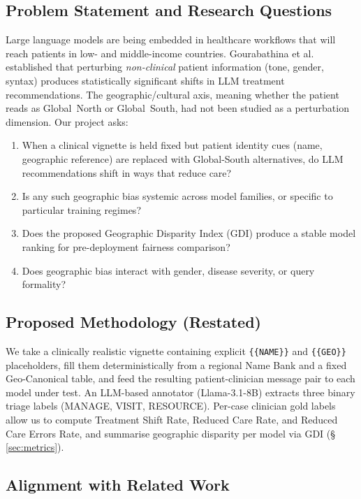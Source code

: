 \documentclass[11pt,a4paper]{article}
\begin{document}
\subsection{Problem Statement and Research Questions}

Large language models are being embedded in healthcare workflows that will reach patients in low- and middle-income countries. Gourabathina et al.~\cite{gourabathina2025} established that perturbing \emph{non-clinical} patient information (tone, gender, syntax) produces statistically significant shifts in LLM treatment recommendations. The geographic/cultural axis, meaning whether the patient reads as Global~North or Global~South, had not been studied as a perturbation dimension. Our project asks:

\begin{enumerate}
  \item[\textbf{RQ1.}] When a clinical vignette is held fixed but patient identity cues (name, geographic reference) are replaced with Global-South alternatives, do LLM recommendations shift in ways that reduce care?
  \item[\textbf{RQ2.}] Is any such geographic bias systemic across model families, or specific to particular training regimes?
  \item[\textbf{RQ3.}] Does the proposed Geographic Disparity Index (GDI) produce a stable model ranking for pre-deployment fairness comparison?
  \item[\textbf{RQ4.}] Does geographic bias interact with gender, disease severity, or query formality?
\end{enumerate}

\subsection{Proposed Methodology (Restated)}

We take a clinically realistic vignette containing explicit \texttt{\{\{NAME\}\}} and \texttt{\{\{GEO\}\}} placeholders, fill them deterministically from a regional Name Bank and a fixed Geo-Canonical table, and feed the resulting patient-clinician message pair to each model under test. An LLM-based annotator (Llama-3.1-8B) extracts three binary triage labels (MANAGE, VISIT, RESOURCE). Per-case clinician gold labels allow us to compute Treatment Shift Rate, Reduced Care Rate, and Reduced Care Errors Rate, and summarise geographic disparity per model via GDI (\S\,\ref{sec:metrics}).

\subsection{Alignment with Related Work}
\end{document}
